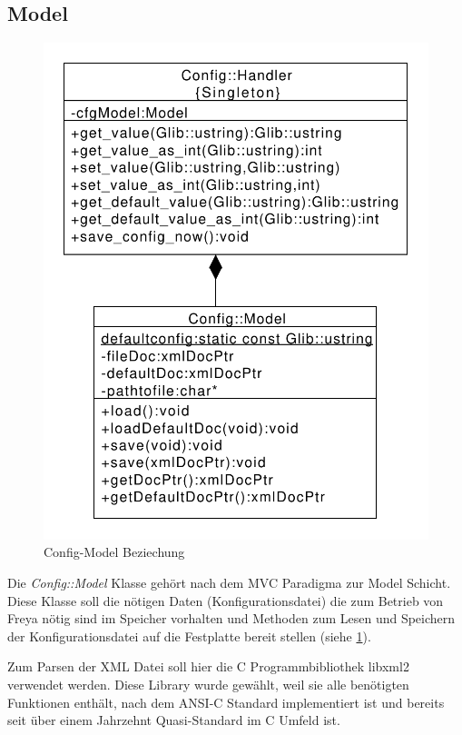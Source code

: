 \subsection{Model}
\begin{figure}[htb!]
    \centering
    \includegraphics[scale=0.6]{./gfx/class/hand_model}
    \caption{Config-Model Beziechung}
    \label{c_confmod}
\end{figure}
Die \emph{Config::Model} Klasse gehört nach dem MVC Paradigma zur Model Schicht. Diese Klasse soll die nötigen Daten (Konfigurationsdatei)
die zum Betrieb von Freya nötig sind im Speicher vorhalten und Methoden zum Lesen und Speichern der Konfigurationsdatei auf die Festplatte bereit stellen (siehe \ref{c_confmod}).



Zum Parsen der XML Datei soll hier die C Programmbibliothek libxml2 verwendet werden. Diese Library wurde gewählt, weil sie alle benötigten Funktionen enthält, nach dem ANSI-C Standard implementiert ist
und bereits seit über einem Jahrzehnt Quasi-Standard im C Umfeld ist.

